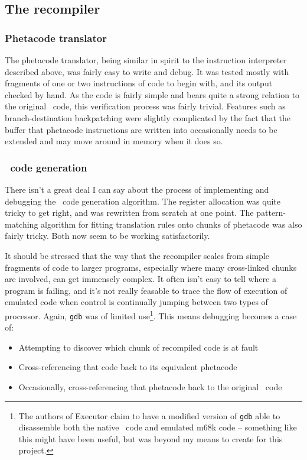 \subsection{The recompiler}

\subsubsection{Phetacode translator}

The phetacode translator, being similar in spirit to the instruction interpreter described above, was fairly easy to write and debug. It was tested mostly with fragments of one or two instructions of code to begin with, and its output checked by hand. As the code is fairly simple and bears quite a strong relation to the original \arm\ code, this verification process was fairly trivial. Features such as branch-destination backpatching were slightly complicated by the fact that the buffer that phetacode instructions are written into occasionally needs to be extended and may move around in memory when it does so.

\subsubsection{\ia\ code generation}

There isn't a great deal I can say about the process of implementing and debugging the \ia\ code generation algorithm. The register allocation was quite tricky to get right, and was rewritten from scratch at one point. The pattern-matching algorithm for fitting translation rules onto chunks of phetacode was also fairly tricky. Both now seem to be working satisfactorily.

It should be stressed that the way that the recompiler scales from simple fragments of code to larger programs, especially where many cross-linked chunks are involved, can get immensely complex. It often isn't easy to tell where a program is failing, and it's not really feasable to trace the flow of execution of emulated code when control is continually jumping between two types of processor. Again, {\tt gdb} was of limited use\footnote{The authors of Executor claim to have a modified version of {\tt gdb} able to disassemble both the native \ia\ code and emulated m68k code -- something like this might have been useful, but was beyond my means to create for this project.}. This means debugging becomes a case of:

\begin{itemize}

\item Attempting to discover which chunk of recompiled code is at fault
\item Cross-referencing that code back to its equivalent phetacode
\item Occasionally, cross-referencing that phetacode back to the original \arm\ code

\end{itemize}

